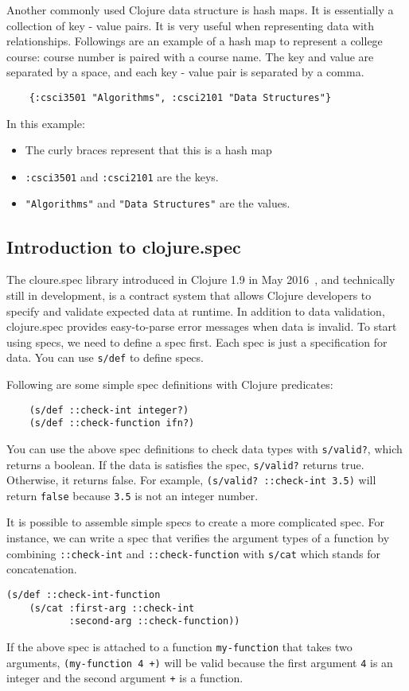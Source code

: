 \documentclass[12pt]{article}
\newcommand{\comment}[1]{{\bf \tt  {#1}}}
\newcommand{\emcomment}[1]{\textcolor{ForestGreen}{\comment{Elena: {#1}}}}
\newcommand{\tscomment}[1]{\textcolor{Teal}{\comment{Tony: {#1}}}}
\begin{document}
	Another commonly used Clojure data structure is hash maps. It is essentially a collection of key - value pairs. 
	It is very useful when representing data with relationships. Followings are an example of a hash map to 
	represent a college course: course number is paired with a course name. 
	The key and value are separated by a space, and each key - value pair is 
	separated by a comma.
	\begin{verbatim}
	{:csci3501 "Algorithms", :csci2101 "Data Structures"}
	\end{verbatim}
	In this example:
	\begin{itemize}
	\item The curly braces represent that this is a hash map
	\item {\tt :csci3501} and {\tt :csci2101} are the keys.
	\item {\tt "Algorithms"} and {\tt  "Data Structures"} are the values.
	\end{itemize}
	
	\subsection{Introduction to clojure.spec}\label{sec:intro-spec}
	The cloure.spec library introduced in Clojure 1.9 in May 2016~\cite{spec}, and technically still in development,  is a contract system that allows 
	Clojure developers to specify and validate expected data 
	at runtime. In addition to data validation, clojure.spec provides easy-to-parse error messages when data is invalid. 
	To start using specs, we need to define a spec first. Each spec is just a specification for data.
	You can use \texttt{s/def} to define specs.

	Following are some simple spec definitions with Clojure predicates:
	\begin{verbatim}
	(s/def ::check-int integer?)
	(s/def ::check-function ifn?)
	\end{verbatim}
	You can use the above spec definitions to check data types with {\tt s/valid?}, which returns a boolean.
	If the data is satisfies the spec, {\tt s/valid?} returns true. Otherwise, it returns false. For example, 
	{\tt (s/valid? ::check-int 3.5)} will return {\tt false} because {\tt 3.5} is not an integer number.
	
	It is possible to assemble simple specs to create a more complicated spec. For instance, we can write a spec that verifies 
	the argument types of a function by combining \texttt{::check-int} and \texttt{::check-function} with \texttt{s/cat} 
	which stands for concatenation. 
	\begin{verbatim}
(s/def ::check-int-function 
    (s/cat :first-arg ::check-int 
           :second-arg ::check-function))
	\end{verbatim}
	If the above spec is attached to a function {\tt my-function} that takes two arguments, 
	{\tt (my-function 4 +)} will be valid 
	because the first argument {\tt 4} is an integer and the second argument {\tt +} is a function.
	
\end{document}
